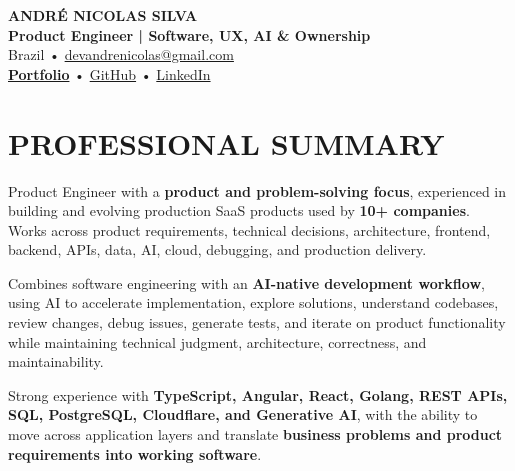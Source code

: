 \documentclass[10pt,a4paper]{article}
\begin{document}

\begin{center}

    {\LARGE \textbf{ANDRÉ NICOLAS SILVA}} \\[-2pt]

    {\normalsize \textbf{Product Engineer | Software, UX, AI \& Ownership}} \\[1pt]

    \footnotesize
    Brazil \quad • \quad
    \href{mailto:devandrenicolas@gmail.com}{devandrenicolas@gmail.com} \\[-1pt]

    \textbf{\href{https://portfolio-andrenicolas.vercel.app}{Portfolio}}
    \quad • \quad
    \href{https://github.com/devAndreNicolas}{GitHub}
    \quad • \quad
    \href{https://www.linkedin.com/in/devandrenicolas}{LinkedIn}

\end{center}

\vspace{-3pt}


\section*{PROFESSIONAL SUMMARY}

\footnotesize

Product Engineer with a \textbf{product and problem-solving focus},
experienced in building and evolving production SaaS products used by
\textbf{10+ companies}. Works across product requirements, technical
decisions, architecture, frontend, backend, APIs, data, AI, cloud,
debugging, and production delivery.

Combines software engineering with an \textbf{AI-native development
workflow}, using AI to accelerate implementation, explore solutions,
understand codebases, review changes, debug issues, generate tests,
and iterate on product functionality while maintaining technical
judgment, architecture, correctness, and maintainability.

Strong experience with \textbf{TypeScript, Angular, React, Golang,
REST APIs, SQL, PostgreSQL, Cloudflare, and Generative AI}, with the
ability to move across application layers and translate
\textbf{business problems and product requirements into working
software}.
\end{document}
